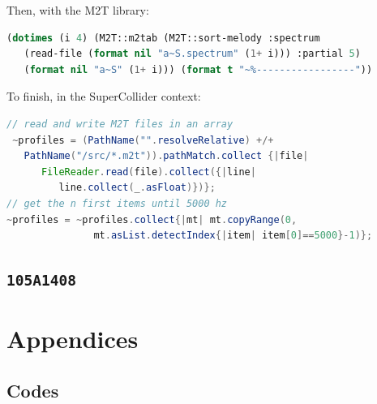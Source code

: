 \documentclass{book}
\begin{document}
Then, with the M2T library:

 \begin{lstlisting}[basicstyle=\footnotesize\ttfamily,language=Lisp]
(dotimes (i 4) (M2T::m2tab (M2T::sort-melody :spectrum 
   (read-file (format nil "a~S.spectrum" (1+ i))) :partial 5) 
   (format nil "a~S" (1+ i))) (format t "~%-----------------"))
\end{lstlisting}

To finish, in the SuperCollider context:

 \begin{lstlisting}[basicstyle=\footnotesize\ttfamily,language=Java]
// read and write M2T files in an array
 ~profiles = (PathName("".resolveRelative) +/+ 
   PathName("/src/*.m2t")).pathMatch.collect {|file| 
      FileReader.read(file).collect({|line| 
         line.collect(_.asFloat)})};
// get the n first items until 5000 hz
~profiles = ~profiles.collect{|mt| mt.copyRange(0, 
               mt.asList.detectIndex{|item| item[0]==5000}-1)};
 \end{lstlisting}
 
 \bigskip

\begin{mdframed}[style=stylesec]
\section{\texttt{105A1408}}
\label{105A1408}
\smallskip
\end{mdframed}


\bigskip

\backmatter



\appendix
\renewcommand\thefigure{\thesection.\arabic{figure}}    
\setcounter{figure}{0}    
\chapter{Appendices}
\thispagestyle{empty}
\makeatletter
\setcounter{secnumdepth}{4}
\makeatother
\renewcommand{\thesection}{\Alph{section}}
\section{Codes}
\end{document}
